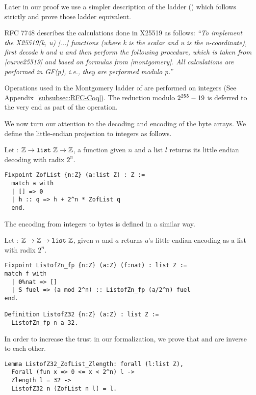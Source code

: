 Later in our proof we use a simpler description of the ladder
() which follows strictly 
and prove those ladder equivalent.

RFC 7748 describes the calculations done in X25519 as follows:
\emph{``To implement the X25519(k, u) [...] functions (where k is
  the scalar and u is the u-coordinate), first decode k and u and then
  perform the following procedure, which is taken from [curve25519] and
  based on formulas from [montgomery].  All calculations are performed
  in GF(p), i.e., they are performed modulo p.''}~\cite{rfc7748}

Operations used in the Montgomery ladder of  are performed on
integers (See Appendix~\ref{subsubsec:RFC-Coq}).
The reduction modulo $2^{255}-19$ is deferred to the very end as part of the
 operation.

We now turn our attention to the decoding and encoding of the byte arrays.
We define the little-endian projection to integers as follows.
\begin{dfn}
  Let  : $\mathbb{Z} \rightarrow \texttt{list}~\mathbb{Z} \rightarrow \mathbb{Z}$,
  a function given $n$ and a list $l$ returns its little endian decoding with radix $2^n$.
\end{dfn}
\begin{lstlisting}[language=Coq,aboveskip=0pt,belowskip=1pt]
Fixpoint ZofList {n:Z} (a:list Z) : Z :=
  match a with
  | [] => 0
  | h :: q => h + 2^n * ZofList q
  end.
\end{lstlisting}
The encoding from integers to bytes is defined in a similar way.
\begin{dfn}
  Let  : $\mathbb{Z} \rightarrow \mathbb{Z} \rightarrow \texttt{list}~\mathbb{Z}$, given
  $n$ and $a$ returns $a$'s little-endian encoding as a list with radix $2^n$.
\end{dfn}
\begin{lstlisting}[language=Coq,aboveskip=1pt,belowskip=1pt]
Fixpoint ListofZn_fp {n:Z} (a:Z) (f:nat) : list Z :=
match f with
  | 0%nat => []
  | S fuel => (a mod 2^n) :: ListofZn_fp (a/2^n) fuel
end.

Definition ListofZ32 {n:Z} (a:Z) : list Z :=
  ListofZn_fp n a 32.
\end{lstlisting}
In order to increase the trust in our formalization, we prove that
 and  are inverse to each other.
\begin{lstlisting}[language=Coq,aboveskip=1pt,belowskip=1pt]
Lemma ListofZ32_ZofList_Zlength: forall (l:list Z),
  Forall (fun x => 0 <= x < 2^n) l ->
  Zlength l = 32 ->
  ListofZ32 n (ZofList n l) = l.
\end{lstlisting}

